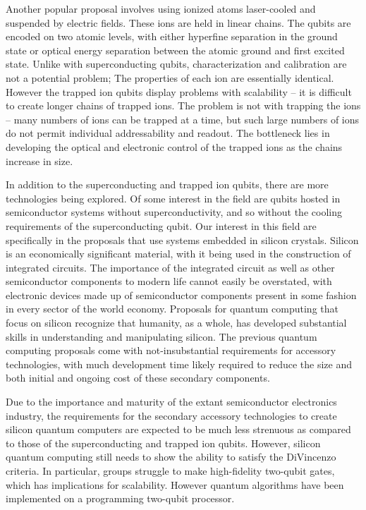 Another popular proposal involves using ionized atoms laser-cooled and suspended
by electric fields. These ions are held in linear chains. The qubits are encoded
on two atomic levels, with either hyperfine separation in the ground state or
optical energy separation between the atomic ground and first excited state.
Unlike with superconducting qubits, characterization and calibration are not a
potential problem; The properties of each ion are essentially identical. However
the trapped ion qubits display problems with scalability -- it is difficult to
create longer chains of trapped ions. The problem is not with trapping the ions
-- many numbers of ions can be trapped at a time, but such large numbers of ions
do not permit individual addressability and readout. The bottleneck lies in
developing the optical and electronic control of the trapped ions as the chains
increase in size.

In addition to the superconducting and trapped ion qubits, there are more
technologies being explored. Of some interest in the field are qubits hosted in
semiconductor systems without superconductivity, and so without the cooling
requirements of the superconducting qubit. Our interest in this field are
specifically  in the proposals that use systems embedded in silicon crystals.
Silicon is an economically significant material, with it being used in the
construction of integrated circuits. The importance of the integrated circuit as
well as other semiconductor components to modern life cannot easily be
overstated, with electronic devices made up of semiconductor components present
in some fashion in every sector of the world economy. Proposals for quantum
computing that focus on silicon recognize that humanity, as a whole, has
developed substantial skills in understanding and manipulating silicon. The
previous quantum computing proposals come with not-insubstantial requirements
for accessory technologies, with much development time likely required to
reduce the size and both initial and ongoing cost of these secondary components.

Due to the importance and maturity of the extant semiconductor electronics
industry, the requirements for the secondary accessory technologies to create
silicon quantum computers are expected to be much less strenuous as compared to
those of the superconducting and trapped ion qubits. However, silicon quantum
computing still needs to show the ability to satisfy the DiVincenzo criteria. In
particular, groups struggle to make high-fidelity two-qubit gates, which has
implications for scalability. However quantum algorithms have been implemented
on a programming two-qubit processor.
